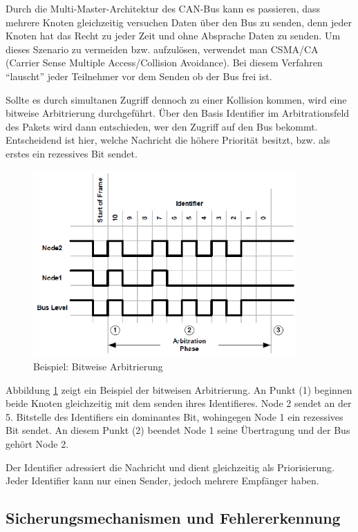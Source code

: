 Durch die Multi-Master-Architektur des CAN-Bus kann es passieren, dass mehrere Knoten gleichzeitig versuchen
Daten über den Bus zu senden, denn jeder Knoten hat das Recht zu jeder Zeit und ohne Absprache Daten zu senden.
Um dieses Szenario zu vermeiden bzw. aufzulösen, verwendet man CSMA/CA (Carrier Sense Multiple 
Access/Collision Avoidance). Bei diesem Verfahren ``lauscht'' jeder Teilnehmer vor dem Senden ob der Bus frei ist.

Sollte es durch simultanen Zugriff dennoch zu einer Kollision kommen, wird eine bitweise Arbitrierung durchgeführt.
Über den Basis Identifier im Arbitrationsfeld des Pakets wird dann entschieden, wer den Zugriff auf den Bus bekommt.
Entscheidend ist hier, welche Nachricht die höhere Priorität besitzt, bzw. als erstes ein rezessives Bit sendet.

\begin{figure}[h] 
\centering
\includegraphics[width=0.9\textwidth]{figures/bitwisearb}
\caption{Beispiel: Bitweise Arbitrierung \citep{BWA}} 
\label{pic:bitwise}
\end{figure} 

Abbildung \ref{pic:bitwise} zeigt ein Beispiel der bitweisen Arbitrierung. An Punkt (1) beginnen beide 
Knoten gleichzeitig mit dem senden ihres Identifieres. Node 2 sendet an der 5. Bitstelle des Identifiers 
ein dominantes Bit, wohingegen Node 1 ein rezessives Bit sendet. An diesem Punkt (2) beendet 
Node 1 seine Übertragung und der Bus gehört Node 2.

Der Identifier adressiert die Nachricht und dient gleichzeitig als Priorisierung. Jeder Identifier kann 
nur einen Sender, jedoch mehrere Empfänger haben.

\subsection{Sicherungsmechanismen und Fehlererkennung}
\label{sec:security}

